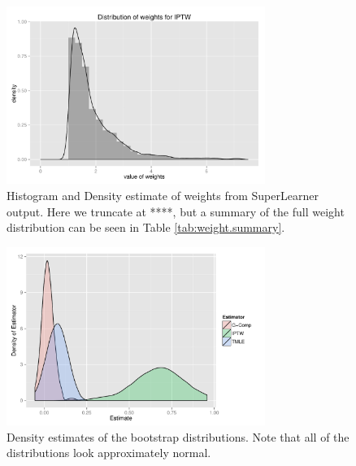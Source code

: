 \documentclass{article}
\begin{document}
\begin{figure}
\centering
\includegraphics[width=0.75\textwidth]{figures/density-plot_ghat.pdf}
\caption{Histogram and Density estimate of weights from SuperLearner output. Here we truncate at ****, but a summary of the full weight distribution can be seen in Table \ref{tab:weight.summary}.}
\label{fig:weight.dist}
\end{figure}

\begin{figure}
\centering
\includegraphics[width=0.75\textwidth]{figures/naiveBootstrapDensities.pdf}
\caption{Density estimates of the bootstrap distributions. Note that all of the distributions look approximately normal.}
\label{fig:boot.distr}
\end{figure}
\end{document}
